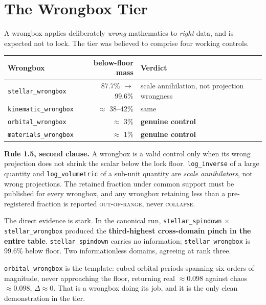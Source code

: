 \documentclass[11pt, letterpaper, openany]{book}
\begin{document}
\section{The Wrongbox Tier}

A wrongbox applies deliberately \emph{wrong} mathematics to \emph{right} data, and is expected
not to lock. The tier was believed to comprise four working controls.

\begin{table}[H]
\centering
\small
\begin{tabular}{@{}lrl@{}}
\toprule
\textbf{Wrongbox} & \textbf{below-floor mass} & \textbf{Verdict} \\
\midrule
\texttt{stellar\_wrongbox} & 87.7\% $\to$ 99.6\% & scale annihilation, not projection wrongness \\
\texttt{kinematic\_wrongbox} & $\approx$ 38--42\% & same \\
\texttt{orbital\_wrongbox} & $\approx$ 3\% & \textbf{genuine control} \\
\texttt{materials\_wrongbox} & $\approx$ 1\% & \textbf{genuine control} \\
\bottomrule
\end{tabular}
\end{table}

\begin{rulingbox}
\textbf{Rule 1.5, second clause.} A wrongbox is a valid control only when its wrong projection
does not shrink the scalar below the lock floor. \texttt{log\_inverse} of a large quantity and
\texttt{log\_volumetric} of a sub-unit quantity are \emph{scale annihilators}, not wrong
projections. The retained fraction under common support must be published for every wrongbox,
and any wrongbox retaining less than a pre-registered fraction is reported \textsc{out-of-range},
never \textsc{collapse}.
\end{rulingbox}

The direct evidence is stark. In the canonical run, \texttt{stellar\_spindown} $\times$
\texttt{stellar\_wrongbox} produced the \textbf{third-highest cross-domain pinch in the entire
table}. \texttt{stellar\_spindown} carries no information; \texttt{stellar\_wrongbox} is 99.6\%
below floor. Two informationless domains, agreeing at rank three.

\texttt{orbital\_wrongbox} is the template: cubed orbital periods spanning six orders of
magnitude, never approaching the floor, returning real $\approx 0.098$ against chaos
$\approx 0.098$, $\Delta \approx 0$. That is a wrongbox doing its job, and it is the only clean
demonstration in the tier.
\end{document}
